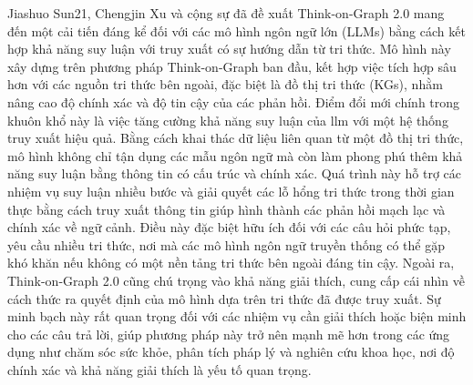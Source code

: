 Jiashuo Sun21, Chengjin Xu và cộng sự \cite{tog2_2024} đã đề xuất Think-on-Graph 2.0 mang đến một cải tiến đáng kể đối với các mô hình ngôn ngữ lớn (LLMs) bằng cách kết hợp khả năng suy luận với truy xuất có sự hướng dẫn từ tri thức. Mô hình này xây dựng trên phương pháp Think-on-Graph \cite{tog_2024} ban đầu, kết hợp việc tích hợp sâu hơn với các nguồn tri thức bên ngoài, đặc biệt là đồ thị tri thức (KGs), nhằm nâng cao độ chính xác và độ tin cậy của các phản hồi.
Điểm đổi mới chính trong khuôn khổ này là việc tăng cường khả năng suy luận của \gls{llm} với một hệ thống truy xuất hiệu quả. Bằng cách khai thác dữ liệu liên quan từ một đồ thị tri thức, mô hình không chỉ tận dụng các mẫu ngôn ngữ mà còn làm phong phú thêm khả năng suy luận bằng thông tin có cấu trúc và chính xác. Quá trình này hỗ trợ các nhiệm vụ suy luận nhiều bước và giải quyết các lỗ hổng tri thức trong thời gian thực bằng cách truy xuất thông tin giúp hình thành các phản hồi mạch lạc và chính xác về ngữ cảnh. Điều này đặc biệt hữu ích đối với các câu hỏi phức tạp, yêu cầu nhiều tri thức, nơi mà các mô hình ngôn ngữ truyền thống có thể gặp khó khăn nếu không có một nền tảng tri thức bên ngoài đáng tin cậy.
Ngoài ra, Think-on-Graph 2.0 cũng chú trọng vào khả năng giải thích, cung cấp cái nhìn về cách thức ra quyết định của mô hình dựa trên tri thức đã được truy xuất. Sự minh bạch này rất quan trọng đối với các nhiệm vụ cần giải thích hoặc biện minh cho các câu trả lời, giúp phương pháp này trở nên mạnh mẽ hơn trong các ứng dụng như chăm sóc sức khỏe, phân tích pháp lý và nghiên cứu khoa học, nơi độ chính xác và khả năng giải thích là yếu tố quan trọng.

